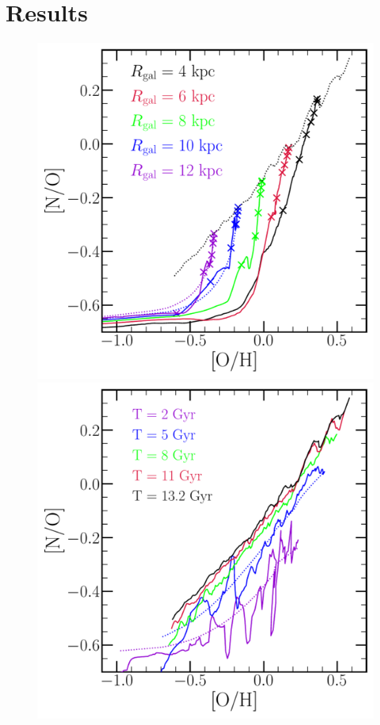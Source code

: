 \documentclass[ms.tex]{subfiles}
\begin{document}
 

\section{Results} 
\label{sec:results} 

\begin{figure} 
\centering 
\includegraphics[scale = 0.45]{no_oh_superposition.pdf} 
\includegraphics[scale = 0.45]{no_oh_timeevol.pdf} 

\end{figure}
\end{document}
